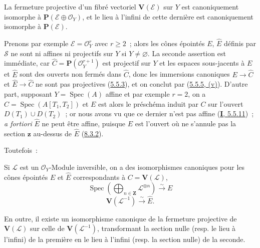 \begin{proposition}[8.4.2]
\label{II.8.4.2-fr}
La fermeture projective d'un fibré vectoriel $\mathbf{V}(\mathcal{E})$ sur
$Y$ est canoniquement isomorphe à
$\mathbf{P}(\mathcal{E}\oplus\mathcal{O}_Y)$, et le lieu à l'infini de cette
dernière est canoniquement isomorphe à $\mathbf{P}(\mathcal{E})$.
\end{proposition}

\begin{remark}[8.4.3]
\label{II.8.4.3-fr}
Prenons par exemple $\mathcal{E}=\mathcal{O}_Y^r$ avec $r\geq2$~; alors les
cônes épointés $E$, $\widehat{E}$ définis par $\mathcal{S}$ ne sont ni affines
ni projectifs sur $Y$ si $Y\neq\varnothing$. La seconde assertion est
immédiate, car $\widehat{C}=\mathbf{P}(\mathcal{O}_Y^{r+1})$ est projectif sur
$Y$ et les espaces sous-jacents à $E$ et $\widehat{E}$ sont des ouverts non
fermés dans $\widehat{C}$, donc les immersions canoniques
$E\to\widehat{C}$ et $\widehat{E}\to\widehat{C}$ ne sont pas projectives
(\hyperref[II.5.5.3-fr]{5.5.3}), et on conclut par
(\hyperref[II.5.5.5-fr]{5.5.5, (v)}). D'autre part, supposant
$Y=\operatorname{Spec}(A)$ affine et par exemple $r=2$, on a
$C=\operatorname{Spec}(A[T_1,T_2])$ et $E$ est alors le préschéma induit par
$C$ sur l'ouvert $D(T_1)\cup D(T_2)$~; or nous avons vu que ce dernier n'est
pas affine (\hyperref[I.5.5.11-fr]{\textbf{I}, 5.5.11})~; 
\emph{a fortiori} $\widehat{E}$ ne peut être affine, puisque $E$ est l'ouvert
où ne s'annule pas la section $\mathbf{z}$ au-dessus de $\widehat{E}$
(\hyperref[II.8.3.2-fr]{8.3.2}).

Toutefois~:
\end{remark}

\begin{proposition}[8.4.4]
\label{II.8.4.4-fr}
Si $\mathcal{L}$ est un $\mathcal{O}_Y$-Module inversible, on a des
isomorphismes canoniques pour les cônes épointés $E$ et $\widehat{E}$
correspondants à $C=\mathbf{V}(\mathcal{L})$,
\begin{equation}
\label{II.8.4.4.1-fr}
  \operatorname{Spec}\left(
    \bigoplus_{n\in\mathbf{Z}}\mathcal{L}^{\otimes n}
  \right)\xrightarrow{\sim}E
\tag{8.4.4.1}
\end{equation}
\begin{equation}
\label{II.8.4.4.2-fr}
  \mathbf{V}(\mathcal{L}^{-1})\xrightarrow{\sim}\widehat{E}.
\tag{8.4.4.2}
\end{equation}

En outre, il existe un isomorphisme canonique de la fermeture projective de
$\mathbf{V}(\mathcal{L})$ sur celle de $\mathbf{V}(\mathcal{L}^{-1})$,
transformant la section nulle \textup{(resp.} le lieu à l'infini\textup{)} de la première en le
lieu à l'infini \textup{(resp.} la section nulle\textup{)} de la seconde.
\end{proposition}

